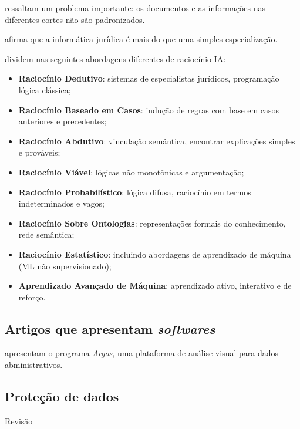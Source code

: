 \documentclass[
]{book}
\providecommand{\tightlist}{%
  \setlength{\itemsep}{0pt}\setlength{\parskip}{0pt}}
\begin{document}
\citet{Colombo2017} ressaltam um problema importante: os documentos e as informações nas diferentes cortes não são padronizados.

\citet{Saarenpaä2018} afirma que a informática jurídica é mais do que uma simples especialização.

\citet{Waltl2018} dividem nas seguintes abordagens diferentes de raciocínio IA:

\begin{itemize}
\tightlist
\item
  \textbf{Raciocínio Dedutivo}: sistemas de especialistas jurídicos, programação lógica clássica;
\item
  \textbf{Raciocínio Baseado em Casos}: indução de regras com base em casos anteriores e precedentes;
\item
  \textbf{Raciocínio Abdutivo}: vinculação semântica, encontrar explicações simples e prováveis;
\item
  \textbf{Raciocínio Viável}: lógicas não monotônicas e argumentação;
\item
  \textbf{Raciocínio Probabilístico}: lógica difusa, raciocínio em termos indeterminados e vagos;
\item
  \textbf{Raciocínio Sobre Ontologias}: representações formais do conhecimento, rede semântica;
\item
  \textbf{Raciocínio Estatístico}: incluindo abordagens de aprendizado de máquina (ML não supervisionado);
\item
  \textbf{Aprendizado Avançado de Máquina}: aprendizado ativo, interativo e de reforço.
\end{itemize}

\hypertarget{artigos-que-apresentam-softwares}{%
\subsection{\texorpdfstring{Artigos que apresentam \emph{softwares}}{Artigos que apresentam softwares}}\label{artigos-que-apresentam-softwares}}

\citet{Guarino2019} apresentam o programa \emph{Argos}, uma plataforma de análise visual para dados abministrativos.

\hypertarget{proteuxe7uxe3o-de-dados}{%
\subsection{Proteção de dados}\label{proteuxe7uxe3o-de-dados}}

Revisão
\end{document}
